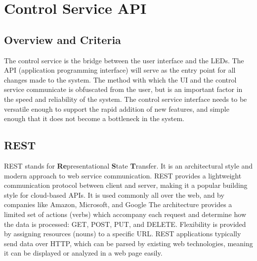 \documentclass[onecolumn, draftclsnofoot,10pt, compsoc]{IEEEtran}
\begin{document}
\newpage

\tableofcontents
\clearpage
\singlespace

\newpage





	\section{Control Service API}
		\subsection{Overview and Criteria}
		The control service is the bridge between the user interface and the LEDs.
		The API (application programming interface) will serve as the entry point for all changes made to the system.
		The method with which the UI and the control service communicate is obfuscated from the user, but is an important factor in the speed and reliability of the system.
		The control service interface needs to be versatile enough to support the rapid addition of new features, and simple enough that it does not become a bottleneck in the system.

		\subsection{REST}
		REST stands for \textbf{Re}presentational \textbf{S}tate \textbf{T}ransfer.
		It is an architectural style and modern approach to web service communication. \cite[ch.5]{rest1}
		REST provides a lightweight communication protocol between client and server,
		making it a popular building style for cloud-based APIs.
		It is used commonly all over the web, and by companies like Amazon, Microsoft, and Google \cite{rest2}
		The architecture provides a limited set of actions (verbs) which accompany each request and determine how the data is processed: GET, POST, PUT, and DELETE.
		Flexibility is provided by assigning resources (nouns) to a specific URL.
		REST applications typically send data over HTTP, which can be parsed by existing web technologies, meaning it can be displayed or analyzed in a web page easily.
\end{document}
